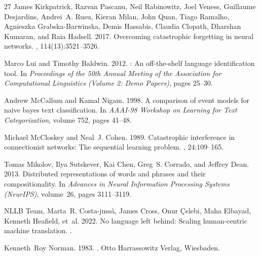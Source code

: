 \documentclass[11pt]{article}
\begin{document}
\begin{thebibliography}{27}
James Kirkpatrick, Razvan Pascanu, Neil Rabinowitz, Joel Veness, Guillaume Desjardins, Andrei~A. Rusu, Kieran Milan, John Quan, Tiago Ramalho, Agnieszka Grabska-Barwinska, Demis Hassabis, Claudia Clopath, Dharshan Kumaran, and Raia Hadsell. 2017.
\newblock Overcoming catastrophic forgetting in neural networks.
, 114(13):3521--3526.

Marco Lui and Timothy Baldwin. 2012.
: An off-the-shelf language identification tool.
\newblock In {\em Proceedings of the 50th Annual Meeting of the Association for Computational Linguistics (Volume 2: Demo Papers)}, pages 25--30.

Andrew McCallum and Kamal Nigam. 1998.
\newblock A comparison of event models for naive bayes text classification.
\newblock In {\em AAAI-98 Workshop on Learning for Text Categorization}, volume 752, pages 41--48.

Michael McCloskey and Neal~J. Cohen. 1989.
\newblock Catastrophic interference in connectionist networks: The sequential learning problem.
, 24:109--165.

Tomas Mikolov, Ilya Sutskever, Kai Chen, Greg~S. Corrado, and Jeffrey Dean. 2013.
\newblock Distributed representations of words and phrases and their compositionality.
\newblock In {\em Advances in Neural Information Processing Systems (NeurIPS)}, volume~26, pages 3111--3119.

NLLB Team, Marta~R. Costa-juss{\`a}, James Cross, Onur {\c{C}}elebi, Maha Elbayad, Kenneth Heafield, et~al. 2022.
\newblock No language left behind: Scaling human-centric machine translation.
.

Kenneth~Roy Norman. 1983.
.
\newblock Otto Harrassowitz Verlag, Wiesbaden.


\end{thebibliography}
\end{document}
